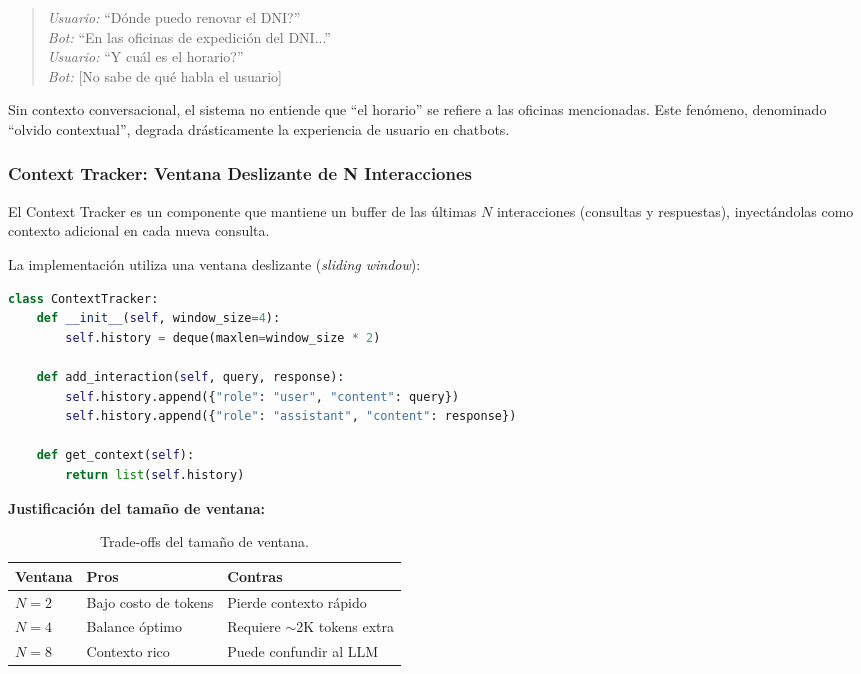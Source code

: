 \begin{quote}
\textit{Usuario:} ``\textquestiondown D\'onde puedo renovar el DNI?''\\
\textit{Bot:} ``En las oficinas de expedici\'on del DNI...''\\[6pt]
\textit{Usuario:} ``\textquestiondown Y cu\'al es el horario?''\\
\textit{Bot:} [No sabe de qu\'e habla el usuario]
\end{quote}

Sin contexto conversacional, el sistema no entiende que ``el horario'' se refiere a las oficinas mencionadas. Este fen\'omeno, denominado ``olvido contextual'', degrada dr\'asticamente la experiencia de usuario en chatbots.

\subsubsection{Context Tracker: Ventana Deslizante de N Interacciones}
\label{subsubsec:context-tracker}

El Context Tracker es un componente que mantiene un buffer de las \'ultimas $N$ interacciones (consultas y respuestas), inyect\'andolas como contexto adicional en cada nueva consulta.

La implementaci\'on utiliza una ventana deslizante (\textit{sliding window}):

\begin{lstlisting}[language=Python, caption={Pseudoc\'odigo del Context Tracker.}]
class ContextTracker:
    def __init__(self, window_size=4):
        self.history = deque(maxlen=window_size * 2)

    def add_interaction(self, query, response):
        self.history.append({"role": "user", "content": query})
        self.history.append({"role": "assistant", "content": response})

    def get_context(self):
        return list(self.history)
\end{lstlisting}

\textbf{Justificaci\'on del tama\~no de ventana:}

\begin{table}[H]
\centering
\caption{Trade-offs del tama\~no de ventana.}
\label{tab:window-tradeoffs}
\begin{tabular}{@{}lll@{}}
\toprule
\textbf{Ventana} & \textbf{Pros} & \textbf{Contras} \\
\midrule
$N=2$ & Bajo costo de tokens & Pierde contexto r\'apido \\
$N=4$ & Balance \'optimo & Requiere $\sim$2K tokens extra \\
$N=8$ & Contexto rico & Puede confundir al LLM \\
\bottomrule
\end{tabular}
\end{table}

